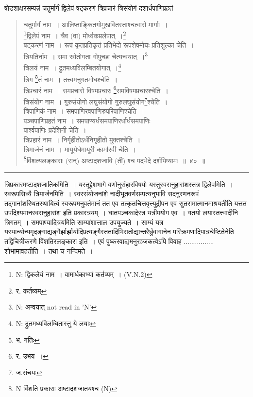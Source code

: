 \documentclass[11pt, openany]{book}
\begin{document}
{\qt षोडशाक्षरसम्पन्नं चतुर्मार्गं द्विलेपं षट्करणं त्रिप्रचारं त्रिसंयोगं दशार्धपाणिप्रहतं}

\newpage

\begin{quote}
{\na  चतुर्मार्गं नाम~। आलिप्ताङ्कितगोमुखवितस्ताश्चत्वारो मार्गाः~। \\
 \renewcommand{\thefootnote}{1a}\footnote{N: द्विकलेयं नाम~। वामार्धकाभ्यां कर्तव्यम्~। (V.N.2)}द्विलेपं नाम~। चैव (वा) मोर्ध्वकप्रलेपात्~।\renewcommand{\thefootnote}{1}\footnote{र. कर्तव्यम्}\\
 षट्करणं नाम~। रूपं कृतप्रतिकृतं प्रतिभेदो रूपशेषमोघः प्रतिशुल्का चेति~। \\
 त्रियतिर्नाम~। समा स्रोतोगता गोपुच्छा चेत्यन्वयात्~।\renewcommand{\thefootnote}{1b}\footnote{N: अन्वयात् not read in 'N'}\\
 त्रिलयं नाम~। द्रुतमध्यविलम्बितयोगात्~।\renewcommand{\thefootnote}{1c}\footnote{N: द्रुतमध्यविलम्बितास्तु ये लयाः}\\
 त्रिग \renewcommand{\thefootnote}{2}\footnote{भ. गतिः}तं नाम~। तत्त्वमनुगतमोघश्चेति~।\\
 त्रिप्रचारं नाम~। समप्रचारो विषमप्रचारः \renewcommand{\thefootnote}{3}\footnote{र. उभय~।}समविषमप्रचारश्चेति~।\\
 त्रिसंयोग नाम~। गुरुसंयोगो लघुसंयोगो गुरुलघुसंयोग\renewcommand{\thefootnote}{4}\footnote{ज.संचयः}श्चेति~।\\
 त्रिपाणिकं नाम~। समपाणिरवपाणिरुपरिपाणिश्चेति~।\\
 पञ्चपाणिप्रहतं नाम~। समपाण्यर्धसमपाणिरर्धार्धसमपाणिः\\
 पार्श्वपाणिः प्रदेशिनी चेति~।\\
 त्रिप्रहारं नाम~। निर्गृहीतोऽर्धनिगृहीतो मुक्तश्चेति~।\\
 त्रिमार्जनं नाम~। मायूर्यर्धमायूरी कार्मारवी चेति~।\\
 \renewcommand{\thefootnote}{5}\footnote{N विंशति प्रकाराः अष्टादशजातयश्च (N)}विंशत्यलङ्काराः (रान्) अष्टादशजावि (ती) श्च पदभेदे दर्शयिष्यामः~॥~४०~॥}
\end{quote}

\hrule

\vspace{2mm}
\noindent
{\qtt त्रिप्रकारमष्टादशजातिकमिति}~। यस्तूद्देशभागे वर्णानुसंहारविषयो यस्तुस्वरानुहारांशस्तत्र द्विलेपमिति~। स्वरूपसिध्यै त्रिमार्जनमिति~। स्वरसंयोजनांशे नादीभूतवर्णसम्पत्यनुभावि सदनुरणनरूपं तद्गानांशस्थितस्थायित्वं स्वरूपमनुवर्तमानं तत एव तत्कृतचित्तवृत्त्युद्रीपन एव सुतरामात्मानमाश्रयतीति यत्तत उपदिश्यमानस्वरानुहारांश इति प्रकारत्रयम्~। घातपञ्चकादेरत्र यत्रीपयोग एव~। गतयो लयास्तत्त्वादीनि त्रिगतम्~। समपाण्यादित्रयमिति साम्यांशात्ताल उपयुज्यते~। साम्यं यत्र यस्यान्योन्यमृदङ्गाद्यङ्गैर्झार्झार्यादिप्रत्यङ्गैस्ततादिभिरातोद्यान्तरैर्ध्रुवागानेन परिक्रमणादिपात्रचेष्टितेनेति तद्विचित्रीकरणे विंशतिरलङ्कारा इति~। एवं पुष्करवाद्यमनुरञ्जकत्वेऽपि विवाह ................ शोभामावहतीति~। तथा च नन्दिमते~।
\end{document}
